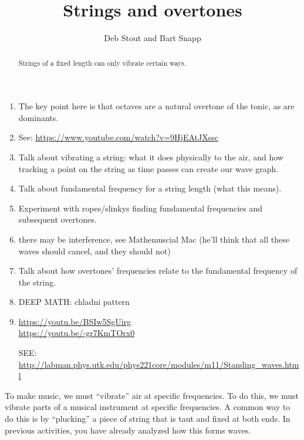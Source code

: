 \documentclass[12pt,noauthor,nooutcomes,]{ximera}
\author{Deb Stout and Bart Snapp}
\title{Strings and overtones}
\begin{document}
\begin{abstract}
  Strings of a fixed length can only vibrate certain ways.
\end{abstract}
\maketitle
    
\begin{instructorNotes}
\begin{enumerate}
\item The key point here is that octaves are a natural overtone of the tonic, as are dominants. 
\item See: \url{https://www.youtube.com/watch?v=9HjEAtJXssc}
\item Talk about vibrating a string: what it does physically to the air, and how tracking a point on the string as time passes can create our wave graph.

\item Talk about fundamental frequency for a string length (what this means).

\item Experiment with ropes/slinkys finding fundamental frequencies and subsequent overtones.

\item there may be interference, see Mathemuscial Mac (he'll think that all these waves should cancel, and they should not)

\item Talk about how overtones' frequencies relate to the fundamental frequency of the string.
\item DEEP MATH: chladni pattern


\item \begin{center}
\url{https://youtu.be/BSIw5SgUirg}\\
\url{https://youtu.be/-gr7KmTOrx0}
\end{center}

SEE: \url{http://labman.phys.utk.edu/phys221core/modules/m11/Standing\_waves.html}
\end{enumerate}
\end{instructorNotes}

     

To make music, we must ``vibrate'' air at specific frequencies. To do this, we must vibrate parts of a musical instrument at specific frequencies. A common way to do this is by ``plucking'' a piece of string that is taut and fixed at both ends. In previous activities, you have already analyzed how this forms waves. 
\end{document}
